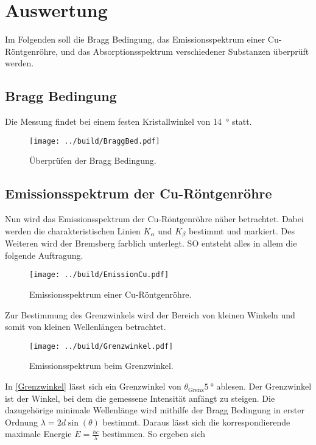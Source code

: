 


\section{Auswertung}
\label{sec:Auswertung}

Im Folgenden soll die Bragg Bedingung, das Emissionsspektrum einer Cu-Röntgenröhre, und das Absorptionsspektrum verschiedener Substanzen überprüft 
werden. 

\subsection{Bragg Bedingung}
Die Messung findet bei einem festen Kristallwinkel von \qty{14}{\degree} statt.

\begin{figure}[H]
    \centering
    \texttt{[image: ../build/BraggBed.pdf]}
    \caption{Überprüfen der Bragg Bedingung.}
\end{figure}    
    
    
\subsection{Emissionsspektrum der Cu-Röntgenröhre}
Nun wird das Emissionsspektrum der Cu-Röntgenröhre näher betrachtet. Dabei werden die charakteristischen Linien $K_\alpha$ und $K_\beta$ bestimmt 
und markiert. Des Weiteren wird der Bremsberg farblich unterlegt. SO entsteht alles in allem die folgende Auftragung. 

\begin{figure}[H]
    \centering
    \texttt{[image: ../build/EmissionCu.pdf]}
    \caption{Emissionsspektrum einer Cu-Röntgenröhre.}
\end{figure}    

\noindent Zur Bestimmung des Grenzwinkels wird der Bereich von kleinen Winkeln und somit von kleinen Wellenlängen betrachtet. 

\begin{figure}[H]
    \centering
    \texttt{[image: ../build/Grenzwinkel.pdf]}
    \caption{Emissionsspektrum beim Grenzwinkel.}
    \label{Grenzwinkel}
\end{figure}    

\noindent In \autoref{Grenzwinkel} lässt sich ein Grenzwinkel von $\theta_\text{Grenz} \qty{5}{\degree}$ ablesen. Der Grenzwinkel ist der Winkel, 
bei dem die gemessene Intensität anfängt zu steigen. Die dazugehörige minimale 
Wellenlänge wird mithilfe der Bragg Bedingung in erster Ordnung $\lambda=2 d \sin(\theta)$ bestimmt. Daraus lässt sich die korrespondierende maximale 
Energie $E=\frac{hc}{\lambda}$ bestimmen. So ergeben sich 


